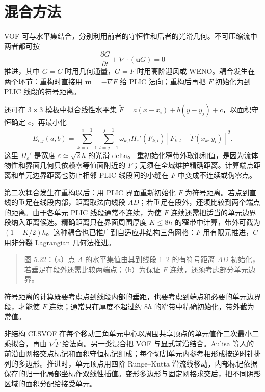 \documentclass[11pt,a4paper,openany,fontset=none]{ctexbook}
\begin{document}
\section{混合方法}

VOF 可与水平集结合，分别利用前者的守恒性和后者的光滑几何。不可压缩流中两者都可按
\begin{equation}
\frac{\partial G}{\partial t}+\nabla\cdot(\bm uG)=0
\tag{5.50}
\end{equation}
推进，其中 $G=C$ 时用几何通量，$G=F$ 时用高阶迎风或 WENO。耦合发生在两个环节：重构时直接用 $\bm m=-\nabla F$ 给 PLIC 法向；重构后再把 $F$ 初始化为到 PLIC 线段的符号距离。

还可在 $3\times3$ 模板中拟合线性水平集 $\widetilde F=a(x-x_i)+b(y-y_j)+c$，以面积守恒确定 $c$，再最小化
\begin{equation}
E_{i,j}(a,b)=\sum_{k=i-1}^{i+1}\sum_{l=j-1}^{j+1}
\omega_{k,l}H_\varepsilon'(F_{k,l})
[F_{k,l}-\widetilde F(x_k,y_l)]^2.
\tag{5.51}
\end{equation}
这里 $H_\varepsilon'$ 是宽度 $\varepsilon\simeq\sqrt2h$ 的光滑 delta。%
重初始化窄带外取饱和值，是因为流体物性和界面几何只依赖零等值面附近的 $F$；无须在全域维护精确距离。计算端点距离和单元边界距离也防止相邻 PLIC 线段间的小缝在 $F$ 中变成不连续或伪零点。

第二次耦合发生在重构以后：用 PLIC 界面重新初始化 $F$ 为符号距离。若点到直线的垂足在线段内部，距离取法向线段 $AD$；若垂足在段外，还须比较到两个端点的距离。由于各单元 PLIC 线段通常不连续，为使 $F$ 连续还需把适当的单元边界段纳入距离候选。精确距离只在界面周围厚度 $K\le8h$ 的窄带中计算，带外可截为 $(1+K/2)h$。这种耦合也已推广到自适应非结构三角网格：$F$ 用有限元推进，$C$ 用非分裂 Lagrangian 几何法推进。

\begin{quote}\small 图 5.22：（a）点 $A$ 的水平集值由其到线段 1--2 的有符号距离 $AD$ 初始化，若垂足在段外还需比较两端点；（b）为保证 $F$ 连续，还须考虑部分单元边界。\end{quote}
符号距离的计算既要考虑点到线段内部的垂距，也要考虑到端点和必要的单元边界段，才能使 $F$ 连续；通常只在厚度不超过约 $8h$ 的窄带中精确初始化，带外截为常值。

非结构 CLSVOF 在每个移动三角单元中心以周围共享顶点的单元值作二次最小二乘拟合，再由 $\nabla\widetilde F$ 给法向。另一类混合把 VOF 与显式前沿结合。Aulisa 等人的前沿由网格交点标记和面积守恒标记组成；每个切割单元内参考相形成按逆时针排列的多边形。推进时，单元顶点用四阶 Runge--Kutta 沿流线移动，内部标记依据保存的归一化局部坐标作双线性插值。变形多边形与固定网格求交后，把不同阴影区域的面积分配给接受单元。
\end{document}
